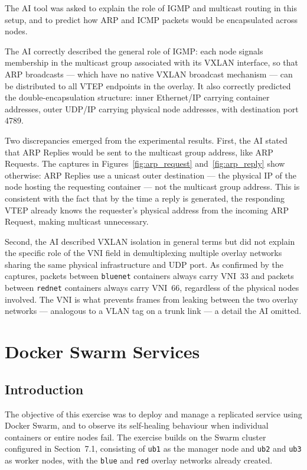 \documentclass[12pt]{article}
\begin{document}
The AI tool was asked to explain the role of IGMP and multicast routing in this 
setup, and to predict how ARP and ICMP packets would be encapsulated across nodes.

The AI correctly described the general role of IGMP: each node signals membership 
in the multicast group associated with its VXLAN interface, so that ARP broadcasts 
--- which have no native VXLAN broadcast mechanism --- can be distributed to all 
VTEP endpoints in the overlay. It also correctly predicted the double-encapsulation 
structure: inner Ethernet/IP carrying container addresses, outer UDP/IP carrying 
physical node addresses, with destination port 4789.

Two discrepancies emerged from the experimental results. First, the AI stated that 
ARP Replies would be sent to the multicast group address, like ARP Requests. The 
captures in Figures~\ref{fig:arp_request} and~\ref{fig:arp_reply} show otherwise: 
ARP Replies use a unicast outer destination --- the physical IP of the node hosting 
the requesting container --- not the multicast group address. This is consistent 
with the fact that by the time a reply is generated, the responding VTEP already 
knows the requester's physical address from the incoming ARP Request, making 
multicast unnecessary.

Second, the AI described VXLAN isolation in general terms but did not explain the 
specific role of the VNI field in demultiplexing multiple overlay networks sharing 
the same physical infrastructure and UDP port. As confirmed by the captures, packets 
between \texttt{bluenet} containers always carry VNI~33 and packets between 
\texttt{rednet} containers always carry VNI~66, regardless of the physical nodes 
involved. The VNI is what prevents frames from leaking between the two overlay 
networks --- analogous to a VLAN tag on a trunk link --- a detail the AI omitted.

\section{Docker Swarm Services}

\subsection{Introduction}

The objective of this exercise was to deploy and manage a replicated service using Docker Swarm, and to observe its self-healing behaviour when individual containers or entire nodes fail. The exercise builds on the Swarm cluster configured in Section~7.1, consisting of \texttt{ub1} as the manager node and \texttt{ub2} and \texttt{ub3} as worker nodes, with the \texttt{blue} and \texttt{red} overlay networks already created.
\end{document}
